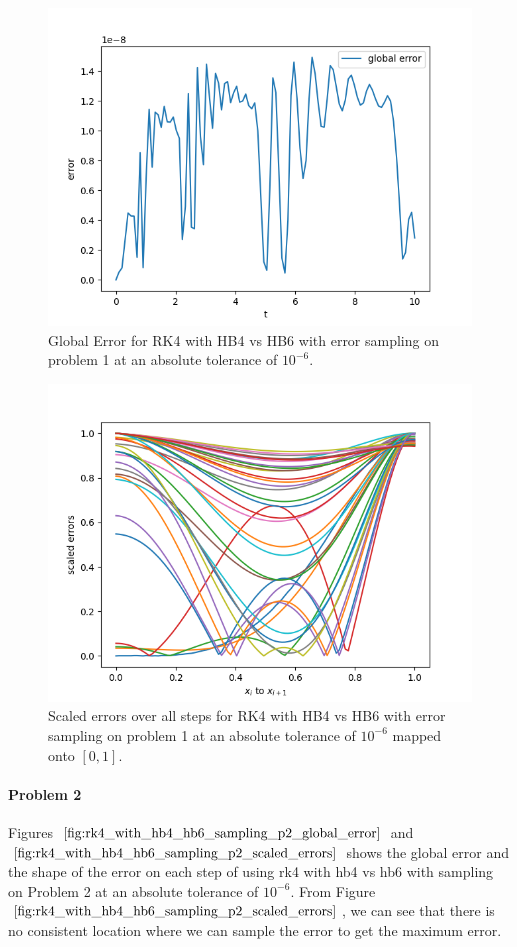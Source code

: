 \begin{figure}[H]
\centering
\includegraphics[width=0.7\linewidth]{./figures/rk4_with_hb4_hb6_sampling_p1_global_error}
\caption{Global Error for RK4 with HB4 vs HB6 with error sampling on problem 1 at an absolute tolerance of $10^{-6}$.}
\label{fig:rk4_with_hb4_hb6_sampling_p1_global_error}
\end{figure}

\begin{figure}[H]
\centering
\includegraphics[width=0.7\linewidth]{./figures/rk4_with_hb4_hb6_sampling_p1_scaled_errors}
\caption{Scaled errors over all steps for RK4 with HB4 vs HB6 with error sampling on problem 1 at an absolute tolerance of $10^{-6}$ mapped onto $[0, 1]$.}
\label{fig:rk4_with_hb4_hb6_sampling_p1_scaled_errors}
\end{figure}

\paragraph{Problem 2} Figures $\ref{fig:rk4_with_hb4_hb6_sampling_p2_global_error}$ and $\ref{fig:rk4_with_hb4_hb6_sampling_p2_scaled_errors}$ shows the global error and the shape of the error on each step of using rk4 with hb4 vs hb6 with sampling on Problem 2 at an absolute tolerance of $10^{-6}$. From Figure $\ref{fig:rk4_with_hb4_hb6_sampling_p2_scaled_errors}$, we can see that there is no consistent location where we can sample the error to get the maximum error.

